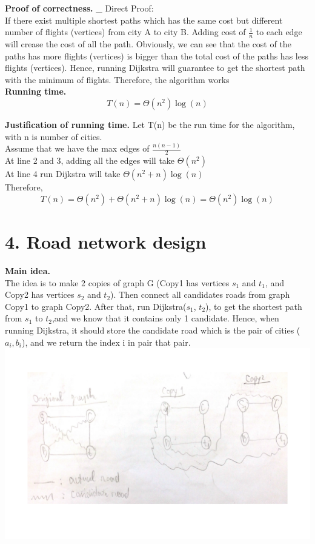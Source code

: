 \documentclass[11pt]{article}
\begin{document}
\noindent
\textbf{Proof of correctness.}
\_ Direct Proof:\\
If there exist multiple shortest paths which has the same cost but different number of flights (vertices) from city A to city B. Adding cost of $\frac{1}{n}$ to each edge will crease the cost of all the path. Obviously, we can see that the cost of the paths has more flights (vertices) is bigger than the total cost of the paths has less flights (vertices). Hence, running Dijkstra will guarantee to get the shortest path with the minimum of flights. Therefore, the algorithm works\\


\noindent
\textbf{Running time.}
$$\boxed{T(n) = \Theta(n^2)\log(n)}$$

\noindent
\textbf{Justification of running time.}
Let T(n) be the run time for the algorithm, with n is number of cities.\\
Assume that we have the max edges of $\frac{n(n-1)}{2}$\\
At line 2 and 3, adding all the edges will take $\Theta(n^2)$\\
At line 4 run Dijkstra will take $\Theta(n^2 + n)\log(n)$\\
Therefore,
$$T(n) = \Theta(n^2) + \Theta(n^2 + n)\log(n) = \Theta(n^2)\log(n)$$

\newpage
\section*{4. Road network design}
\noindent
\textbf{Main idea.}\\
The idea is to make 2 copies of graph G (Copy1 has vertices $s_1$ and $t_1$, and Copy2 has vertices $s_2$ and $t_2$). Then connect all candidates roads from graph Copy1 to  graph Copy2. After that, run Dijkstra($s_1$, $t_2$), to get the shortest path  from $s_1$ to $t_2$,and we know that it contains only 1 candidate. Hence, when running Dijkstra, it should store the candidate road which is the pair of cities ($a_i,b_i$), and we return the index i in pair that pair.\\
\includegraphics[scale=0.25]{p4.png}\\
\end{document}

